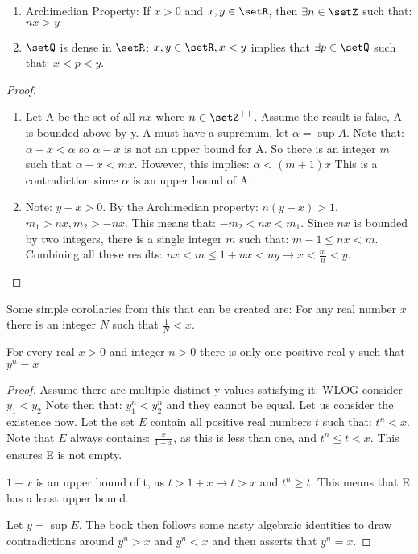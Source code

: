 \documentclass[12pt, letterpaper]{paper}
\begin{document}
\begin{theorem}
  \label{thr:1.20}
  \begin{enumerate}
  \item Archimedian Property: If $x > 0$ and $x,y \in \setR$, then
    $\exists n \in \setZ$ such that: $nx > y$
  \item $\setQ$ is dense in $\setR$: $x,y \in \setR, x < y$ implies
    that $\exists p \in \setQ$ such that: $x < p < y$.
  \end{enumerate}
\end{theorem}
\begin{proof}
  \begin{enumerate}
  \item Let A be the set of all $nx$ where $n \in \setZ^{++}$. Assume
    the result is false, A is bounded above by y. A must have a
    supremum, let $\alpha = \sup{A}$. Note that: $\alpha - x < \alpha$
    so $\alpha - x$ is not an upper bound for A. So there is an
    integer $m$ such that $\alpha - x < mx$.  However, this implies:
    $\alpha < (m+1)x$ This is a contradiction since $\alpha$ is an
    upper bound of A.
  \item Note: $y-x > 0$. By the Archimedian property: $n(y-x) > 1$.
    $m_{1} > nx, m_2 > -nx$. This means that: $-m_2 < nx < m_1$. Since
    $nx$ is bounded by two integers, there is a single integer $m$
    such that: $m-1 \leq nx < m$. Combining all these results:
    \newline $nx < m \leq 1 + nx < ny \to x < \frac{m}{n} < y$.
  \end{enumerate}
  
\end{proof}

Some simple corollaries from this that can be created are: For any
real number $x$ there is an integer $N$ such that $\frac{1}{N} < x$.


\begin{theorem}
  \label{thr:1.21}
  For every real $x>0$ and integer $n > 0$ there is only one positive
  real y such that $y^{n} = x$
\end{theorem}
\begin{proof}
  Assume there are multiple distinct y values satisfying it: WLOG
  consider $y_1 < y_2$ Note then that: $y_1^n < y_2^n$ and they cannot
  be equal.  \newline Let us consider the existence now. Let the set
  $E$ contain all positive real numbers $t$ such that: $t^n < x$. Note
  that $E$ always contains: $\frac{x}{1+x}$, as this is less than one,
  and $t^n \leq t < x$. This ensures E is not empty.

  $1+x$ is an upper bound of t, as $t>1+x \to t > x$ and $t^n \geq
  t$. This means that E has a least upper bound.

  Let $y = \sup{E}$. The book then follows some nasty algebraic
  identities to draw contradictions around $y^n > x$ and $y^n < x$ and
  then asserts that $y^n = x$.
\end{proof}
\end{document}
